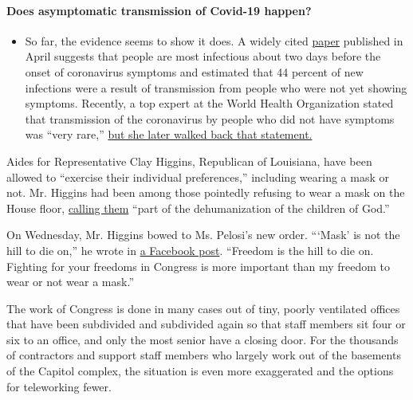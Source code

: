 \begin{itemize}
{  \paragraph{Does asymptomatic transmission of Covid-19
  happen?}\label{does-asymptomatic-transmission-of-covid-19-happen}}

  \begin{itemize}
  \tightlist
  \item
    So far, the evidence seems to show it does. A widely cited
    \href{https://www.nature.com/articles/s41591-020-0869-5}{paper}
    published in April suggests that people are most infectious about
    two days before the onset of coronavirus symptoms and estimated that
    44 percent of new infections were a result of transmission from
    people who were not yet showing symptoms. Recently, a top expert at
    the World Health Organization stated that transmission of the
    coronavirus by people who did not have symptoms was ``very rare,''
    \href{https://www.nytimes.com/2020/06/09/world/coronavirus-updates.html?action=click\&pgtype=Article\&state=default\&region=MAIN_CONTENT_3\&context=storylines_faq\#link-1f302e21}{but
    she later walked back that statement.}
  \end{itemize}
\end{itemize}

Aides for Representative Clay Higgins, Republican of Louisiana, have
been allowed to ``exercise their individual preferences,'' including
wearing a mask or not. Mr. Higgins had been among those pointedly
refusing to wear a mask on the House floor,
\href{https://www.cnn.com/2020/05/28/politics/house-republicans-masks-debate-covid/index.html}{calling
them} ``part of the dehumanization of the children of God.''

On Wednesday, Mr. Higgins bowed to Ms. Pelosi's new order. ```Mask' is
not the hill to die on,'' he wrote in
\href{https://www.facebook.com/CongressmanClayHiggins/posts/1220219108326947}{a
Facebook post}. ``Freedom is the hill to die on. Fighting for your
freedoms in Congress is more important than my freedom to wear or not
wear a mask.''

The work of Congress is done in many cases out of tiny, poorly
ventilated offices that have been subdivided and subdivided again so
that staff members sit four or six to an office, and only the most
senior have a closing door. For the thousands of contractors and support
staff members who largely work out of the basements of the Capitol
complex, the situation is even more exaggerated and the options for
teleworking fewer.

